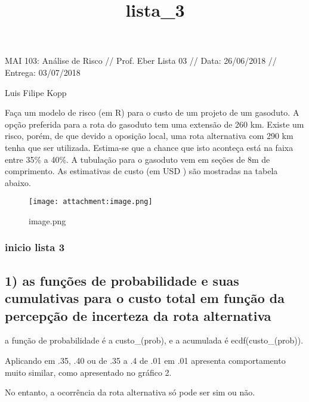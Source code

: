 \documentclass[11pt]{article}
\title{lista\_3}
\makeatletter
\def\maxwidth{\ifdim\Gin@nat@width>\linewidth\linewidth
    \else\Gin@nat@width\fi}
\let\Oldincludegraphics\includegraphics
\renewcommand{\includegraphics}[1]{\Oldincludegraphics[width=.8\maxwidth]{#1}}
\makeatother
\begin{document}
    
    
    \maketitle
    
    

    
    MAI 103: Análise de Risco // Prof. Eber Lista 03 // Data: 26/06/2018 //
Entrega: 03/07/2018

Luis Filipe Kopp

    Faça um modelo de risco (em R) para o custo de um projeto de um
gasoduto. A opção preferida para a rota do gasoduto tem uma extensão de
260 km. Existe um risco, porém, de que devido a oposição local, uma rota
alternativa com 290 km tenha que ser utilizada. Estima-se que a chance
que isto aconteça está na faixa entre 35\% a 40\%. A tubulação para o
gasoduto vem em seções de 8m de comprimento. As estimativas de custo (em
USD ) são mostradas na tabela abaixo.

    \begin{figure}
\centering
\texttt{[image: attachment:image.png]}
\caption{image.png}
\end{figure}

    \subsubsection{inicio lista 3}\label{inicio-lista-3}

    \subsection{1) as funções de probabilidade e suas cumulativas para o
custo total em função da percepção de incerteza da rota
alternativa}\label{as-funuxe7uxf5es-de-probabilidade-e-suas-cumulativas-para-o-custo-total-em-funuxe7uxe3o-da-percepuxe7uxe3o-de-incerteza-da-rota-alternativa}

    a função de probabilidade é a custo\_(prob), e a acumulada é
ecdf(custo\_(prob)).

Aplicando em .35, .40 ou de .35 a .4 de .01 em .01 apresenta
comportamento muito similar, como apresentado no gráfico 2.

No entanto, a ocorrência da rota alternativa só pode ser sim ou não.
\end{document}
